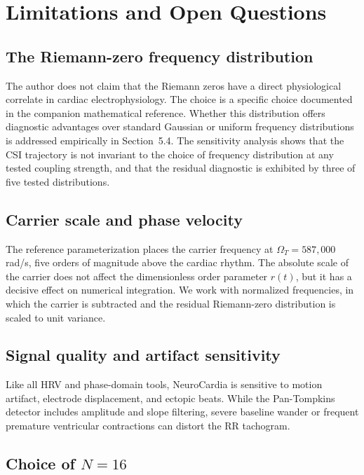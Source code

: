 \documentclass[11pt]{article}
\begin{document}
\section{Limitations and Open Questions}\label{sec:limitations}

\subsection{The Riemann-zero frequency distribution}

The author does not claim that the Riemann zeros have a direct
physiological correlate in cardiac electrophysiology. The choice is a
specific choice documented in the companion mathematical reference.
Whether this distribution offers diagnostic advantages over standard
Gaussian or uniform frequency distributions is addressed empirically in
Section~5.4. The sensitivity analysis shows that the CSI trajectory is
not invariant to the choice of frequency distribution at any tested
coupling strength, and that the residual diagnostic is exhibited by
three of five tested distributions.

\subsection{Carrier scale and phase velocity}

The reference parameterization places the carrier frequency at
$\Omega_T = 587{,}000$ rad/s, five orders of magnitude above the cardiac
rhythm. The absolute scale of the carrier does not affect the
dimensionless order parameter $r(t)$, but it has a decisive effect on
numerical integration. We work with normalized frequencies, in which
the carrier is subtracted and the residual Riemann-zero distribution is
scaled to unit variance.

\subsection{Signal quality and artifact sensitivity}

Like all HRV and phase-domain tools, NeuroCardia is sensitive to motion
artifact, electrode displacement, and ectopic beats. While the
Pan-Tompkins detector includes amplitude and slope filtering, severe
baseline wander or frequent premature ventricular contractions can
distort the RR tachogram.

\subsection{Choice of $N = 16$}
\end{document}
